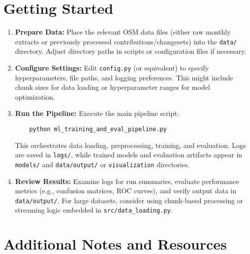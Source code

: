 \documentclass[
    13pt, %
    a4paper, %
    listof=totoc, %
    bibliography=totoc, %
    index=totoc, %
    headsepline
]{scrreprt}
\begin{document}
\section{Getting Started}
\label{sec:getting_started}

\begin{enumerate}
    \item \textbf{Prepare Data:}
    Place the relevant OSM data files (either raw monthly extracts or previously processed contributions/changesets) into the \texttt{data/} directory. Adjust directory paths in scripts or configuration files if necessary.

    \item \textbf{Configure Settings:}
    Edit \texttt{config.py} (or equivalent) to specify hyperparameters, file paths, and logging preferences. This might include chunk sizes for data loading or hyperparameter ranges for model optimization.

    \item \textbf{Run the Pipeline:}
    Execute the main pipeline script:
    \begin{verbatim}
    python ml_training_and_eval_pipeline.py
    \end{verbatim}
    This orchestrates data loading, preprocessing, training, and evaluation. Logs are saved in \texttt{logs/}, while trained models and evaluation artifacts appear in \texttt{models/} and \texttt{data/output/} or \texttt{visualization} directories.

    \item \textbf{Review Results:}
    Examine logs for run summaries, evaluate performance metrics (e.g., confusion matrices, ROC curves), and verify output data in \texttt{data/output/}. For large datasets, consider using chunk-based processing or streaming logic embedded in \texttt{src/data\_loading.py}.
\end{enumerate}

\section{Additional Notes and Resources}
\label{sec:extra_notes}
\end{document}
